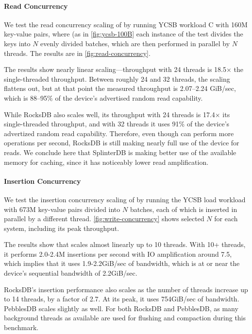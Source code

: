 \paragraph{Read Concurrency}
We test the read concurrency scaling of \sysname{} by running YCSB
workload C with 160M key-value pairs, where (as in \cref{fig:ycsb-100B} each
instance of the test divides the keys into $N$ evenly divided batches, which
are then performed in parallel by $N$ threads. The results are in
\cref{fig:read-concurrency}.

The results show nearly linear scaling---throughput with 24 threads is
18.5$\times$ the single-threaded throughput. Between roughly 24 and 32 threads,
the scaling flattens out, but at that point the measured throughput is
2.07--2.24 GiB/sec, which is 88--95\% of the device's advertised random read
capability.

While RocksDB also scales well, its throughput with 24 threads is 17.4$\times$
its single-threaded throughput, and with 32 threads it uses 91\% of the
device's advertized random read capability. Therefore, even though \sysname can
perform more operations per second, RocksDB is still making nearly full use of
the device for reads. We conclude here that SplinterDB is making better use of
the available memory for caching, since it has noticeably lower read
amplification.


\paragraph{Insertion Concurrency}
We test the insertion concurrency scaling of \sysname by running the YCSB load
workload with 673M key-value pairs divided into $N$ batches, each of which
is inserted in parallel by a different thread. \cref{fig:write-concurrency}
shows selected $N$ for each system, including its peak throughput.

The results show that \sysname scales almost linearly up to 10 threads. With
10+ threads, it performs 2.0-2.4M insertions per second with IO amplification
around 7.5, which implies that it uses 1.9-2.2GiB/sec of bandwidth, which is at
or near the device's sequential bandwidth of 2.2GiB/sec.

RocksDB's insertion performance also scales as the number of threads increase
up to 14 threads, by a factor of 2.7. At its peak, it uses 754GiB/sec of
bandwidth. PebblesDB scales slightly as well.  For both RocksDB and PebblesDB,
as many background threads as available are used for flushing and compaction
during this benchmark.

